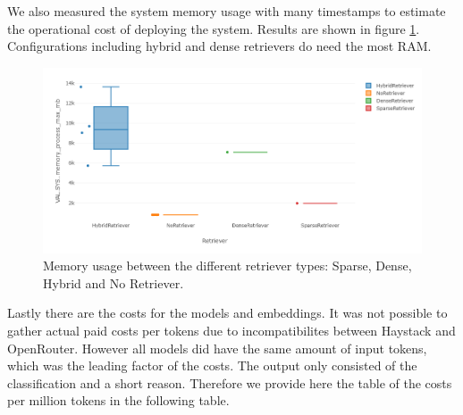 We also measured the system memory usage with many timestamps to estimate the operational cost of deploying the system. Results are shown in figure \ref{fig:memory}. Configurations including hybrid and dense retrievers do need the most RAM. 

\begin{figure}[!ht]
    \centering
    \includegraphics[width=\textwidth]{images/Max MB RAM.png}
    \caption{Memory usage between the different retriever types: Sparse, Dense, Hybrid and No Retriever.}
    \label{fig:memory}
\end{figure}

Lastly there are the costs for the models and embeddings. It was not possible to gather actual paid costs per tokens due to incompatibilites between Haystack and OpenRouter. However all models did have the same amount of input tokens, which was the leading factor of the costs. The output only consisted of the classification and a short reason. Therefore we provide here the table of the costs per million tokens in the following table.

